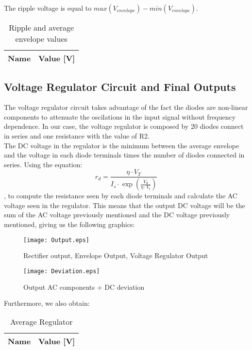 The ripple voltage is equal to $max(V_{envelope})-min(V_{envelope})$.

\begin{table}[H]
  \centering
  \begin{tabular}{|l|r|}
     \hline    
    {\bf Name} & {\bf Value [V]} \\ \hline 
    
  \end{tabular}
  \caption{Ripple and average envelope values}
  \label{tab:env}
\end{table}

\subsection{Voltage Regulator Circuit and Final Outputs}
The voltage regulator circuit takes advantage of the fact the diodes are non-linear components to attenuate the oscilations in the input signal without frequency dependence. In our case, the voltage regulator is composed by 20 diodes connect in series and one resistance with the value of R2.\\

The DC voltage in the regulator is the minimum between the average envelope and the voltage in each diode terminals times the number of diodes connected in series.
Using the equation:
\begin{equation}
 r_d= \frac {\eta \cdot V_T}{ I_s \cdot \exp(\frac{V_d}{\eta \cdot V_t})}
  \label{eq: rd}
\end{equation}
, to compute the resistance seen by each diode terminals and calculate the AC voltage seen in the regulator.
This means that the output DC voltage will be the sum of the AC voltage previously mentioned and the DC voltage previously mentioned, giving us the following graphics:

\begin{figure}[H] \centering
\texttt{[image: Output.eps]}
\caption{Rectifier output, Envelope Output, Voltage Regulator Output}
\label{fig:outputs}
\end{figure}

\begin{figure}[H] \centering
\texttt{[image: Deviation.eps]}
\caption{Output AC components + DC deviation}
\label{fig:deviation}
\end{figure}

Furthermore, we also obtain:
\begin{table}[H]
  \centering
  \begin{tabular}{|l|r|}
     \hline    
    {\bf Name} & {\bf Value [V]} \\ \hline   
    
  \end{tabular}
  \caption{Average Regulator}
  \label{tab:vavg}
\end{table}

